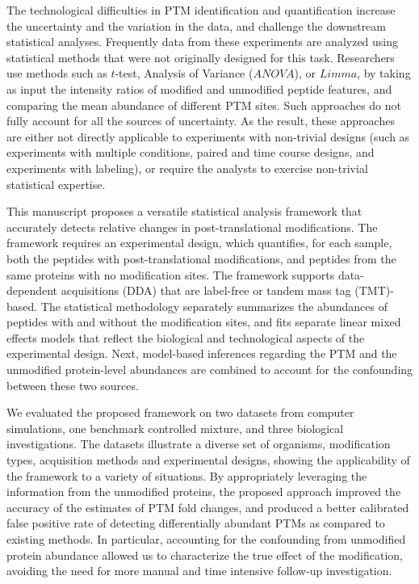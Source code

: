 \documentclass[mcp]{article}
\numberwithin{table}{section}
\begin{document}
The technological difficulties in PTM identification and quantification increase the uncertainty and the variation in the data, and challenge the downstream statistical analyses. Frequently data from these experiments are analyzed using statistical methods that were not originally designed for this task. Researchers use methods such as $t$-test\cite{Kalpic:2011}, Analysis of Variance ($ANOVA$)\cite{girden:1992}, or $Limma$\cite{Ritchie_15a}, by taking as input the intensity ratios of modified and unmodified peptide features, and comparing the mean abundance of different PTM sites. Such approaches do not fully account for all the sources of uncertainty. As the result, these approaches are either not directly applicable to experiments with non-trivial designs (such as experiments with multiple conditions, paired and time course designs, and experiments with labeling), or require the analysts to exercise non-trivial statistical expertise.

This manuscript proposes a versatile statistical analysis framework that accurately detects relative changes in post-translational modifications. The framework requires an experimental design, which quantifies, for each sample, both the peptides with post-translational modifications, and peptides from the same proteins with no modification sites. The framework supports data-dependent acquisitions (DDA) that are label-free or tandem mass tag (TMT)-based. The statistical methodology separately summarizes the abundances of peptides with and without the modification sites, and fits separate linear mixed effects models that reflect the biological and technological aspects of the experimental design. Next, model-based inferences regarding the PTM and the unmodified protein-level abundances are combined to account for the confounding between these two sources.

We evaluated the proposed framework on two datasets from computer simulations, one benchmark controlled mixture, and three biological investigations. The datasets illustrate a diverse set of organisms, modification types, acquisition methods and experimental designs, showing the applicability of the framework to a variety of situations. By appropriately leveraging the information from the unmodified proteins, the proposed approach improved the accuracy of the estimates of PTM fold changes, and produced a better calibrated false positive rate of detecting differentially abundant PTMs as compared to existing methods. In particular, accounting for the confounding from unmodified protein abundance allowed us to characterize the true effect of the modification, avoiding the need for more manual and time intensive follow-up investigation.
\end{document}
